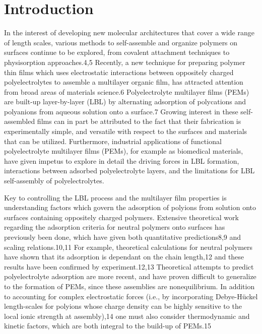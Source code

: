 \documentclass[journal=jacsat,manuscript=article]{achemso}
\begin{document}

\section{Introduction}


In the interest of developing new molecular architectures that cover a wide range of length scales, various methods to self-assemble and organize polymers on surfaces continue to be explored, from covalent attachment techniques\cite{Decher1997,Chen1992,Atkins2002} to physisorption approaches.4,5  Recently, a new technique for preparing polymer thin films which uses electrostatic interactions between oppositely charged polyelectrolytes to assemble a multilayer organic film, has attracted attention from broad areas of materials science.6  Polyelectrolyte multilayer films (PEMs) are built-up layer-by-layer (LBL) by alternating adsorption of polycations and polyanions from aqueous solution onto a surface.7  Growing interest in these self-assembled films can in part be attributed to the fact that their fabrication is experimentally simple, and versatile with respect to the surfaces and materials that can be utilized.  Furthermore, industrial applications of functional polyelectrolyte multilayer films (PEMs), for example as biomedical materials, have given impetus to explore in detail the driving forces in LBL formation, interactions between adsorbed polyelectrolyte layers, and the limitations for LBL self-assembly of polyelectrolytes.

Key to controlling the LBL process and the multilayer film properties is understanding factors which govern the adsorption of polyions from solution onto surfaces containing oppositely charged polymers.  Extensive theoretical work regarding the adsorption criteria for neutral polymers onto surfaces has previously been done, which have given both quantitative predictions8,9 and scaling relations.10,11  For example, theoretical calculations for neutral polymers have shown that its adsorption is dependant on the chain length,12 and these results have been confirmed by experiment.12,13  Theoretical attempts to predict polyelectrolyte adsorption are more recent, and have proven difficult to generalize to the formation of PEMs, since these assemblies are nonequilibrium.  In addition to accounting for complex electrostatic forces (i.e., by incorporating Debye-Hückel length-scales for polyions whose charge density can be highly sensitive to the local ionic strength at assembly),14 one must also consider thermodynamic and kinetic factors, which are both integral to the build-up of PEMs.15 
\end{document}
